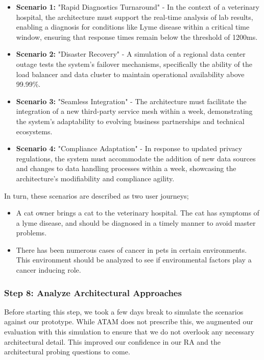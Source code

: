 \documentclass[review]{elsarticle}
\begin{document}
\begin{itemize}
    \item \textbf{Scenario 1:} "Rapid Diagnostics Turnaround" - In the context of a veterinary hospital, the architecture must support the real-time analysis of lab results, enabling a diagnosis for conditions like Lyme disease within a critical time window, ensuring that response times remain below the threshold of 1200ms.
    \item \textbf{Scenario 2:} "Disaster Recovery" - A simulation of a regional data center outage tests the system's failover mechanisms, specifically the ability of the load balancer and data cluster to maintain operational availability above 99.99\%.
    \item \textbf{Scenario 3:} "Seamless Integration" - The architecture must facilitate the integration of a new third-party service mesh within a week, demonstrating the system's adaptability to evolving business partnerships and technical ecosystems.
    \item \textbf{Scenario 4:} "Compliance Adaptation" - In response to updated privacy regulations, the system must accommodate the addition of new data sources and changes to data handling processes within a week, showcasing the architecture's modifiability and compliance agility.
\end{itemize}

In turn, these scenarios are described as two user journeys;

\begin{itemize}
    \item A cat owner brings a cat to the veterinary hospital. The cat has symptoms of a lyme disease, and should be diagnosed in a timely manner to avoid master problems.
    \item There has been numerous cases of cancer in pets in certain environments. This environment should be analyzed to see if environmental factors play a cancer inducing role.
\end{itemize}

\subsubsection{Step 8: Analyze Architectural Approaches}

Before starting this step, we took a few days break to simulate the scenarios against our prototype. While ATAM does not prescribe this, we augmented our evaluation with this simulation to ensure that we do not overlook any necessary architectural detail. This improved our confidence in our RA and the architectural probing questions to come. 
\end{document}
